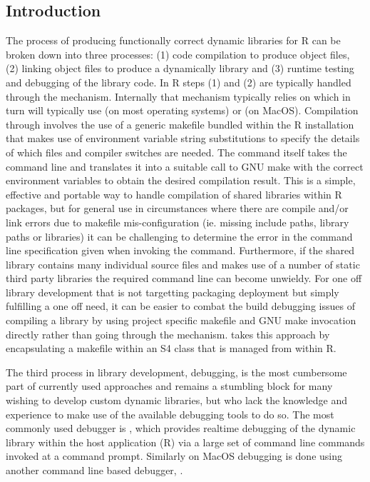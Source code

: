 \hypertarget{introduction}{%
\subsection{Introduction}\label{introduction}}
The process of producing functionally correct dynamic libraries for R can be broken down into three processes: (1) code compilation to produce object files,
(2) linking object files to produce a dynamically library and (3) runtime testing and debugging of the library code. In R steps (1) and (2) 
are typically handled through the \citep{SHLIB} mechanism. Internally that mechanism typically relies on \citep{GnuMake} which 
in turn will typically use \citep{gcc} (on most operating systems) or \citep{LLVM} (on MacOS). Compilation through  
involves the use of a generic makefile bundled within the R installation that makes use of environment variable string substitutions to specify the details 
of which files and compiler switches are needed. The command itself takes the command line and translates it into a suitable call to GNU make with the correct 
environment variables to obtain the desired compilation result. This is a simple, effective and portable way to handle compilation of shared 
libraries within R packages, but for general use in circumstances where there are compile and/or link errors due to makefile mis-configuration 
(ie. missing include paths, library paths or libraries) it can be challenging to determine the error in the command line specification given when 
invoking the  command. Furthermore, if the shared library contains many individual source files and makes use of a number of static
third party libraries the required command line can become unwieldy. For one off library development that is not targetting packaging deployment but 
simply fulfilling a one off need, it can be easier to combat the build debugging issues of compiling a library by using project specific makefile 
and GNU make invocation directly rather than going through the  mechanism.  takes this approach by encapsulating 
a makefile within an S4 class that is managed from within R. 

The third process in library development, debugging, is the most cumbersome part of currently used approaches and remains a stumbling 
block for many wishing to develop custom dynamic libraries, but who lack the knowledge and experience to make use of the available debugging 
tools to do so. The most commonly used debugger is \citep{GDB}, which provides realtime debugging of the dynamic library within the
host application (R) via a large set of command line commands invoked at a command prompt. Similarly on MacOS debugging is done using another 
command line based debugger, \citep{LLDB}. 

